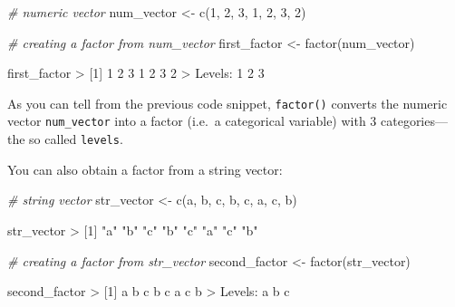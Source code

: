 \documentclass[
]{book}
\newenvironment{Shaded}{\begin{snugshade}}{\end{snugshade}}
\newcommand{\CommentTok}[1]{\textcolor[rgb]{0.56,0.35,0.01}{\textit{#1}}}
\newcommand{\DecValTok}[1]{\textcolor[rgb]{0.00,0.00,0.81}{#1}}
\newcommand{\FunctionTok}[1]{\textcolor[rgb]{0.00,0.00,0.00}{#1}}
\newcommand{\NormalTok}[1]{#1}
\newcommand{\OtherTok}[1]{\textcolor[rgb]{0.56,0.35,0.01}{#1}}
\newcommand{\SpecialCharTok}[1]{\textcolor[rgb]{0.00,0.00,0.00}{#1}}
\newcommand{\StringTok}[1]{\textcolor[rgb]{0.31,0.60,0.02}{#1}}
\begin{document}
\begin{Shaded}
\begin{Highlighting}[]
\CommentTok{\# numeric vector}
\NormalTok{num\_vector }\OtherTok{\textless{}{-}} \FunctionTok{c}\NormalTok{(}\DecValTok{1}\NormalTok{, }\DecValTok{2}\NormalTok{, }\DecValTok{3}\NormalTok{, }\DecValTok{1}\NormalTok{, }\DecValTok{2}\NormalTok{, }\DecValTok{3}\NormalTok{, }\DecValTok{2}\NormalTok{)}

\CommentTok{\# creating a factor from num\_vector}
\NormalTok{first\_factor }\OtherTok{\textless{}{-}} \FunctionTok{factor}\NormalTok{(num\_vector)}

\NormalTok{first\_factor}
\SpecialCharTok{\textgreater{}}\NormalTok{ [}\DecValTok{1}\NormalTok{] }\DecValTok{1} \DecValTok{2} \DecValTok{3} \DecValTok{1} \DecValTok{2} \DecValTok{3} \DecValTok{2}
\SpecialCharTok{\textgreater{}}\NormalTok{ Levels}\SpecialCharTok{:} \DecValTok{1} \DecValTok{2} \DecValTok{3}
\end{Highlighting}
\end{Shaded}

As you can tell from the previous code snippet, \texttt{factor()} converts the numeric
vector \texttt{num\_vector} into a factor (i.e.~a categorical variable) with 3
categories---the so called \texttt{levels}.

You can also obtain a factor from a string vector:

\begin{Shaded}
\begin{Highlighting}[]
\CommentTok{\# string vector}
\NormalTok{str\_vector }\OtherTok{\textless{}{-}} \FunctionTok{c}\NormalTok{(}\StringTok{\textquotesingle{}a\textquotesingle{}}\NormalTok{, }\StringTok{\textquotesingle{}b\textquotesingle{}}\NormalTok{, }\StringTok{\textquotesingle{}c\textquotesingle{}}\NormalTok{, }\StringTok{\textquotesingle{}b\textquotesingle{}}\NormalTok{, }\StringTok{\textquotesingle{}c\textquotesingle{}}\NormalTok{, }\StringTok{\textquotesingle{}a\textquotesingle{}}\NormalTok{, }\StringTok{\textquotesingle{}c\textquotesingle{}}\NormalTok{, }\StringTok{\textquotesingle{}b\textquotesingle{}}\NormalTok{)}

\NormalTok{str\_vector}
\SpecialCharTok{\textgreater{}}\NormalTok{ [}\DecValTok{1}\NormalTok{] }\StringTok{"a"} \StringTok{"b"} \StringTok{"c"} \StringTok{"b"} \StringTok{"c"} \StringTok{"a"} \StringTok{"c"} \StringTok{"b"}

\CommentTok{\# creating a factor from str\_vector}
\NormalTok{second\_factor }\OtherTok{\textless{}{-}} \FunctionTok{factor}\NormalTok{(str\_vector)}

\NormalTok{second\_factor}
\SpecialCharTok{\textgreater{}}\NormalTok{ [}\DecValTok{1}\NormalTok{] a b c b c a c b}
\SpecialCharTok{\textgreater{}}\NormalTok{ Levels}\SpecialCharTok{:}\NormalTok{ a b c}
\end{Highlighting}
\end{Shaded}
\end{document}
